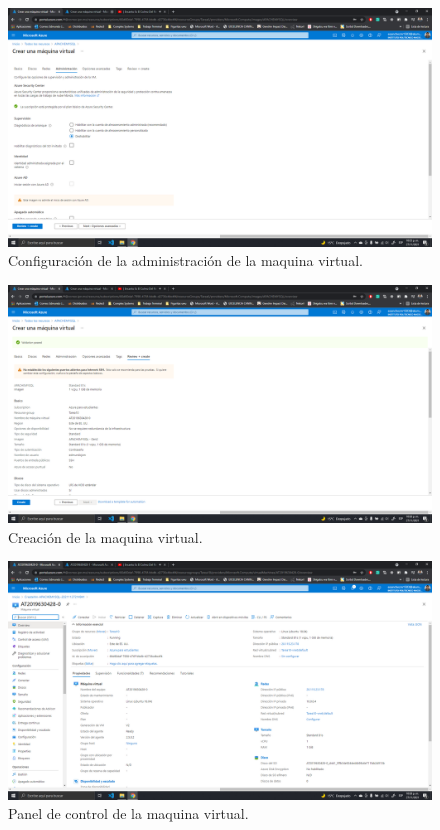 \documentclass[11pt]{article}
\begin{document}
		\begin{figure}[H]
			\centering
			\includegraphics[scale=0.34]{resources/admin0.png}
			\caption{Configuración de la administración de la maquina virtual.}\label{fig:picture}
		\end{figure}
		\begin{figure}[H]
			\centering
			\includegraphics[scale=0.34]{resources/revisarycrear0.png}
			\caption{Creación de la maquina virtual.}\label{fig:picture}
		\end{figure}
		\begin{figure}[H]
			\centering
			\includegraphics[scale=0.34]{resources/paneldecontrol0.png}
			\caption{Panel de control de la maquina virtual.}\label{fig:picture}
		\end{figure}
\end{document}
